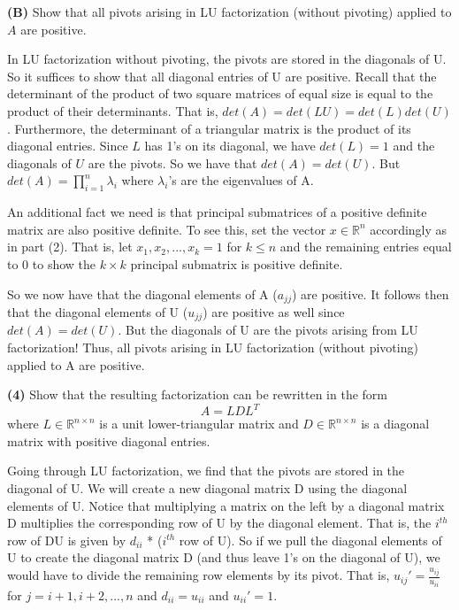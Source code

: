 \documentclass[final,12pt,reqno]{amsart}
\begin{document}
\newpage

\textbf{(B)} Show that all pivots arising in LU factorization (without pivoting) applied to $A$ are positive.

In LU factorization without pivoting, the pivots are stored in the diagonals of U. So it suffices to show that all diagonal entries of U are positive. Recall that the determinant of the product of two square matrices of equal size is equal to the product of their determinants. That is, $det(A) = det(LU) = det(L)det(U)$. Furthermore, the determinant of a triangular matrix is the product of its diagonal entries. Since $L$ has 1's on its diagonal, we have $det(L) = 1$ and the diagonals of $U$ are the pivots. So we have that $det(A) = det(U)$. But $det(A) = {\displaystyle \prod_{i=1}^{n} \lambda_{i}}$ where $\lambda_{i}$'s are the eigenvalues of A.

An additional fact we need is that principal submatrices of a positive definite matrix are also positive definite. To see this, set the vector $x \in \mathbb{R}^n$ accordingly as in part (2). That is, let $x_1,x_2,...,x_k = 1$ for $k \leq n$ and the remaining entries equal to 0 to show the $k\times k$ principal submatrix is positive definite.

So we now have that the diagonal elements of A ($a_{jj}$) are positive. It follows then that the diagonal elements of U ($u_{jj}$) are positive as well since $det(A) = det(U)$. But the diagonals of U are the pivots arising from LU factorization! Thus, all pivots arising in LU factorization (without pivoting) applied to A are positive.

\textbf{(4)} Show that the resulting factorization can be rewritten in the form
\[
	A = LDL^T
\]
where $L \in \mathbb{R}^{n\times n}$ is a unit lower-triangular matrix and $D \in \mathbb{R}^{n\times n}$ is a diagonal matrix with positive diagonal entries.

Going through LU factorization, we find that the pivots are stored in the diagonal of U. We will create a new diagonal matrix D using the diagonal elements of U. Notice that multiplying a matrix on the left by a diagonal matrix D multiplies the corresponding row of U by the diagonal element. That is, the $i^{th}$ row of DU is given by $d_{ii}$ * ($i^{th}$ row of U). So if we pull the diagonal elements of U to create the diagonal matrix D (and thus leave 1's on the diagonal of U), we would have to divide the remaining row elements by its pivot. That is, $u_{ij}' = \frac{u_{ij}}{u_{ii}}$ for $j = i+1,i+2,...,n$ and $d_{ii} = u_{ii}$ and $u_{ii}' = 1$.
\end{document}
